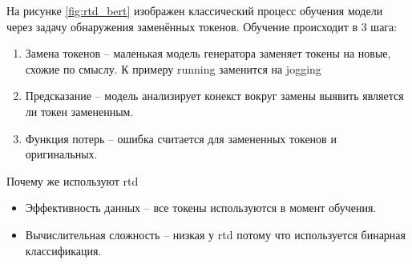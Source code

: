 \documentclass[../part_1.tex]{subfiles}
\begin{document}
\par На рисунке \ref{fig:rtd_bert} изображен классический процесс обучения модели через задачу обнаружения заменённых токенов. Обучение происходит в 3 шага:
\begin{enumerate}
    \item Замена токенов -- маленькая модель генератора заменяет токены на новые, схожие по смыслу. К примеру running заменится на jogging 
    \item Предсказание -- модель анализирует конекст вокруг замены выявить является ли токен замененным.
    \item Функция потерь -- ошибка считается для замененных токенов и оригинальных.
\end{enumerate}
\par Почему же используют \acrshort{rtd}
\begin{itemize}
    \item Эффективность данных -- все токены используются в момент обучения.
    \item Вычислительная сложность -- низкая у \acrshort{rtd} потому что используется бинарная классификация.
\end{itemize}
\end{document}

